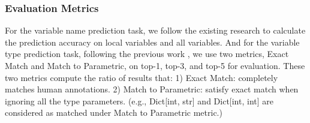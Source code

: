 \subsubsection*{Evaluation Metrics}

For the variable name prediction task, we follow the existing research \cite{tran2019recovering} to calculate the prediction accuracy on local variables and all variables. And for the variable type prediction task, following the previous work \cite{type-graph-icse22}, we use two metrics, Exact Match and Match to Parametric, on top-1, top-3, and top-5 for evaluation. These two metrics compute the ratio of results that: 1) Exact Match: completely matches human annotations. 2) Match to Parametric: satisfy exact match when ignoring all the type parameters. (e.g., Dict[int, str] and Dict[int, int] are considered as matched under Match to Parametric metric.)

